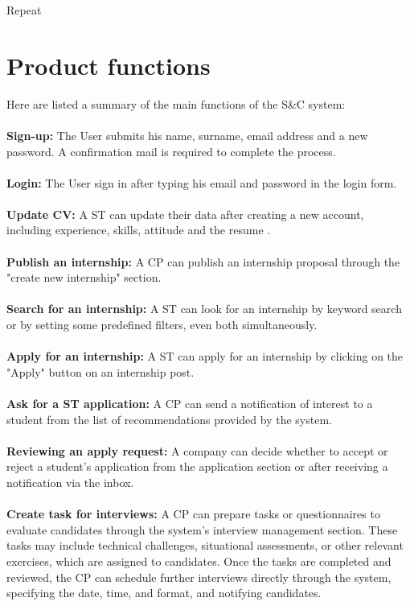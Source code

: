 Repeat

\section{Product functions}
\label{sec:product_functions}%
Here are listed a summary of the main functions of the S\&C system:\\\\
\textbf{ Sign-up:} The User submits his name, surname, email address and a new password. A confirmation mail is required to complete the process.\\\\
\textbf{ Login:} The User sign in after typing his email and password in the login form. \\\\  
\textbf{ Update CV:} A ST can update their data after creating a new account, including experience, skills, attitude and the resume .\\\\
\textbf{ Publish an internship:} A CP can publish an internship proposal through  the "create new internship" section.\\\\
\textbf{ Search for an internship:} A ST can look for an internship by keyword search or by setting some predefined filters, even both simultaneously.\\\\
\textbf{ Apply for an internship:} A ST can apply for an internship by clicking on the "Apply" button on an internship post.\\\\
\textbf{ Ask for a ST application: } A CP can send a notification of interest to a student from the list of recommendations provided by the system.\\\\
\textbf{ Reviewing an apply request:} A company can decide whether to accept or reject a student's application from the application section or after receiving a notification via the inbox.\\\\
\textbf{ Create task for interviews:}  A CP can prepare tasks or questionnaires to evaluate candidates through the system's interview management section. These tasks may include technical challenges, situational assessments, or other relevant exercises, which are assigned to candidates. Once the tasks are completed and reviewed, the CP can schedule further interviews directly through the system, specifying the date, time, and format, and notifying candidates. \\\\

